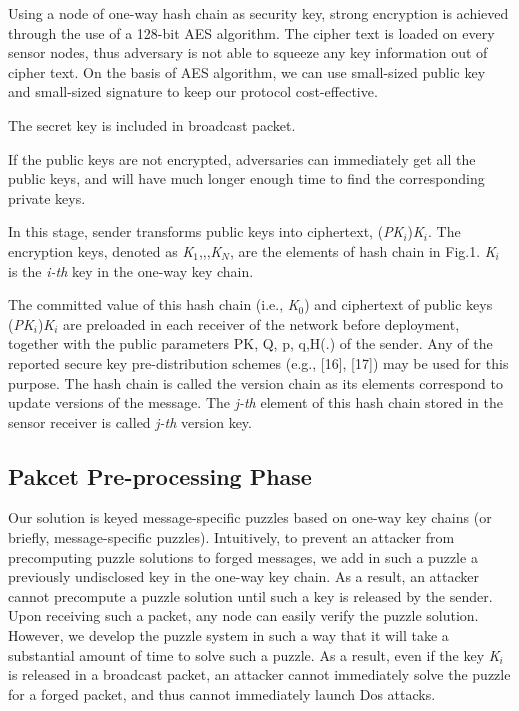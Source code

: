 \documentclass{sig-alternate-05-2015}
\begin{document}
Using a node of one-way hash chain as security key, strong encryption is achieved through the use of a 128-bit AES algorithm. The cipher text is loaded on every sensor nodes, thus adversary is not able to squeeze any key information out of cipher text. On the basis of AES algorithm, we can use small-sized public key and small-sized signature to keep our protocol cost-effective. 

The secret key is included in broadcast packet.     

If the public keys are not encrypted, adversaries can immediately get all the public keys, and will have much longer enough time to find the corresponding private keys.

In this stage, sender transforms public keys into ciphertext, (\emph{PK$_i$})\emph{K$_i$}. The encryption keys, denoted as \emph{K$_1$},,,\emph{K$_N$}, are the elements of hash chain in Fig.1. \emph{K$_i$} is the \emph{i-th} key in the one-way key chain.  

The committed value of this hash chain (i.e., \emph{K$_0$}) and ciphertext of public keys (\emph{PK$_i$})\emph{K$_i$} are preloaded in each receiver of the network before deployment, together with the public parameters {PK, Q, p, q,H(.)} of the sender. Any of the reported secure key pre-distribution schemes (e.g., [16], [17]) may be used for this purpose. The hash chain is called the version chain as its elements correspond to update versions of the message. The \emph{j-th} element of this hash chain stored in the sensor receiver is called \emph{j-th} version key.

\subsection{Pakcet Pre-processing Phase}
Our solution is keyed message-specific puzzles based on one-way key chains
(or briefly, message-specific puzzles). Intuitively, to prevent an attacker from precomputing puzzle solutions to forged messages, we add in such a puzzle a previously undisclosed key in the one-way key chain. As a result, an attacker cannot precompute a puzzle solution until such a key is released by the sender. Upon receiving such a packet, any node can easily verify the puzzle solution. However, we develop the puzzle system in such a way that it will take a substantial amount of time to solve such a puzzle. As a result, even if the key \emph{K$_i$} is released in a broadcast packet, an attacker cannot immediately solve the puzzle for a forged packet, and thus cannot immediately launch Dos attacks.
\end{document}

